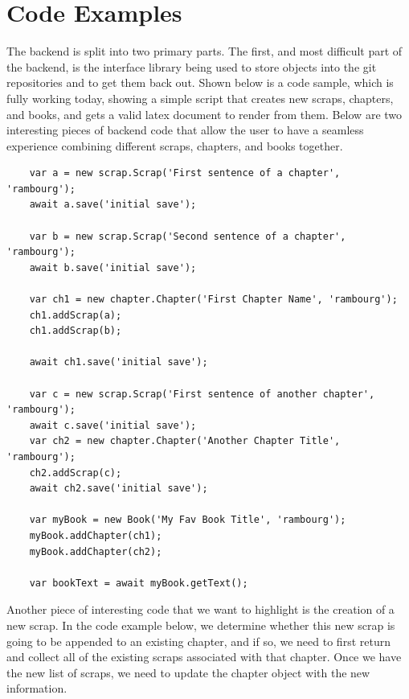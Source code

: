 \documentclass[onecolumn, draftclsnofoot,10pt, compsoc]{IEEEtran}
\begin{document}
	
	\section{Code Examples}
	\noindent The backend is split into two primary parts. The first, and most difficult part
	of the backend, is the interface library being used to store objects into the
	git repositories and to get them back out. Shown below is a code sample, which
	is fully working today, showing a simple script that creates new scraps,
	chapters, and books, and gets a valid latex document to render from them. 
	Below are two interesting pieces of backend code that allow the user to have 
	a seamless experience combining different scraps, chapters, and books together.
	
	\begin{lstlisting}
	var a = new scrap.Scrap('First sentence of a chapter', 'rambourg');
	await a.save('initial save');
	
	var b = new scrap.Scrap('Second sentence of a chapter', 'rambourg');
	await b.save('initial save');
	
	var ch1 = new chapter.Chapter('First Chapter Name', 'rambourg');
	ch1.addScrap(a);
	ch1.addScrap(b);
	
	await ch1.save('initial save');
	
	var c = new scrap.Scrap('First sentence of another chapter', 'rambourg');
	await c.save('initial save');
	var ch2 = new chapter.Chapter('Another Chapter Title', 'rambourg');
	ch2.addScrap(c);
	await ch2.save('initial save');
	
	var myBook = new Book('My Fav Book Title', 'rambourg');
	myBook.addChapter(ch1);
	myBook.addChapter(ch2);
	
	var bookText = await myBook.getText();
	\end{lstlisting}
	
	\newpage
	\noindent Another piece of interesting code that we want to highlight is the creation of a new scrap. In the code example below, we determine whether this new scrap is going to be appended to an existing chapter, and if so, we need to first return and collect all of the existing scraps associated with that chapter. Once we have the new list of scraps, we need to update the chapter object with the new information.
\end{document}
